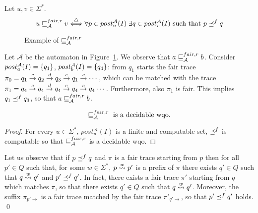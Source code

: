 \begin{definition}
\label{defn:wrfair}
Let $u,v \in \Sigma^*$.
\[ u \sqsubseteq_{\mathcal{A}}^{fair,r} v \overset{\triangle}{\Longleftrightarrow}
    \forall p \in post_u^{\mathcal{A}}(I) \; \exists q \in post_v^{\mathcal{A}}(I) \textrm{ such that } p \preceq^{f} q \]
\end{definition}

\begin{figure}[h]
\centering
{}
\caption{Example of $\sqsubseteq_{\mathcal{A}}^{fair,r}$}
\label{fig:example-wrfair}
\end{figure}

\begin{example}
Let $\mathcal{A}$ be the automaton in Figure~\ref{fig:example-wrfair}.
We observe that $a \sqsubseteq_{\mathcal{A}}^{fair,r} b$.
Consider $post_{a}^{\mathcal{A}}(I) = \{q_1\}$, $post_{b}^{\mathcal{A}}(I) = \{q_4\}$:
from $q_1$ starts the fair trace
$\pi_0 = q_1 \overset{c}{\rightarrow} q_2 \overset{d}{\rightarrow} q_3 \overset{e}{\rightarrow} q_1 \overset{c}{\rightarrow} \cdots$,
which can be matched with the trace
$\pi_1 = q_4 \overset{c}{\rightarrow} q_4 \overset{d}{\rightarrow} q_4 \overset{e}{\rightarrow} q_4 \overset{c}{\rightarrow} q_4 \cdots$.
Furthermore, also $\pi_1$ is fair.
This implies $q_1 \preceq^{f} q_3$, so that $a \sqsubseteq_{\mathcal{A}}^{fair,r} b$.
\end{example}

\begin{proposition}
\label{prop:wrfair-wqo}
\[\sqsubseteq_{\mathcal{A}}^{fair,r} \textrm{ is a decidable wqo.}\]
\end{proposition}

\begin{proof}
For every $u \in \Sigma^*$, $post_u^{\mathcal{A}}(I)$ is a finite and computable set,
$\preceq^{f}$ is computable so that $\sqsubseteq_{\mathcal{A}}^{fair,r}$ is a decidable wqo.
\end{proof}

\begin{remark}\label{remark:fair}
Let us observe that if $p\preceq^{f} q$ and $\pi$ is a fair trace
starting from $p$ then for all $p'\in Q$ such that, for some $w\in \Sigma^*$,
$p\overset{w}{\rightsquigarrow} p'$ is a prefix of $\pi$ there exists $q'\in Q$ such that
$q\overset{w}{\rightsquigarrow} q'$ and
$p'\preceq^{f} q'$.  In fact, there exists a fair trace $\pi'$ starting from
$q$ which matches $\pi$, so that there exists $q'\in Q$ such that
$q\overset{w}{\rightsquigarrow} q'$. Moreover, the suffix
$\pi_{p'\rightarrow}$ is a fair trace matched by the fair trace $\pi'_{q'\rightarrow}$, so that $p' \preceq^{f} q'$ holds. \qed
\end{remark}

